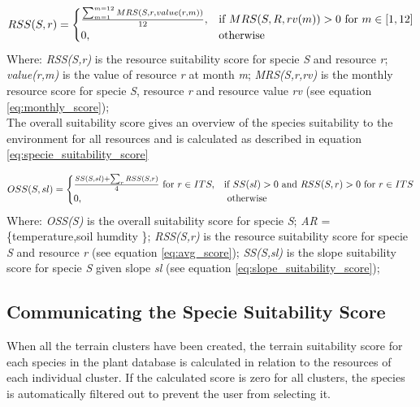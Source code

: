 \begin{equation}
\centering
RSS(S,r) =
\begin{cases}
	\frac{\sum_{m=1}^{m=12} MRS(S,r,value(r,m))}{12}, & \text{if } MRS(S,R,rv(m)) > 0 \text{ for } m \in [1,12] \\
    0,              & \text{otherwise}
\end{cases}
\label{eq:avg_score}
\end{equation}
Where: \textit{RSS(S,r)} is the resource suitability score for specie \textit{S} and resource \textit{r}; \textit{value(r,m)} is the value of resource \textit{r} at month \textit{m}; \textit{MRS(S,r,rv)} is the monthly resource score for specie \textit{S}, resource \textit{r} and resource value \textit{rv} (see equation \ref{eq:monthly_score});\\

The overall suitability score gives an overview of the species suitability to the environment for all resources and is calculated as described in equation \ref{eq:specie_suitability_score}

\begin{equation}
\begin{split}
\centering
OSS(S,sl) = 
\begin{cases}
	\frac{SS(S,sl) + \sum_{r}^{}RSS(S,r)}{4} \text{ for } r \in ITS, & \text{if } SS(sl) > 0 \text{ and } RSS(S,r) > 0 \text{ for } r \in ITS \\
	0, &\text{ otherwise} \\
\end{cases}
\end{split}
\label{eq:specie_suitability_score}
\end{equation}
Where: \textit{OSS(S)} is the overall suitability score for specie \textit{S}; \textit{AR} = \{temperature,soil humdity \}; \textit{RSS(S,r)} is the resource suitability score for specie \textit{S} and resource \textit{r} (see equation \ref{eq:avg_score}); \textit{SS(S,sl)} is the slope suitability score for specie \textit{S} given slope \textit{sl} (see equation \ref{eq:slope_suitability_score}); 

\subsection{Communicating the Specie Suitability Score}

When all the terrain clusters have been created, the terrain suitability score for each species in the plant database is calculated in relation to the resources of each individual cluster. If the calculated score is zero for all clusters, the species is automatically filtered out to prevent the user from selecting it. \\

